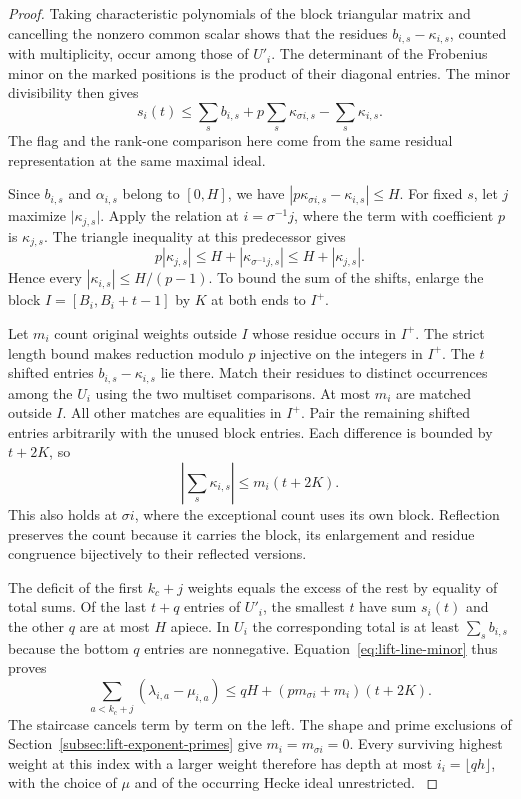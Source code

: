 \begin{proof}
Taking characteristic
polynomials of the block triangular matrix and cancelling
the nonzero common scalar shows that the residues
\(b_{i,s}-\kappa_{i,s}\), counted with multiplicity, occur
among those of \(U'_i\). The determinant of the Frobenius
minor on the marked positions is the product of their
diagonal entries. The minor divisibility then gives
\begin{equation}\label{eq:lift-line-minor}
       s_i(t)\le\sum_s b_{i,s}
              +p\sum_s\kappa_{\sigma i,s}-\sum_s\kappa_{i,s}.
\end{equation}
The flag and the rank-one comparison here come from the
same residual representation at the same maximal ideal.
\label{cor:lift-weight-exchange-1}

Since \(b_{i,s}\) and \(\alpha_{i,s}\) belong to \([0,H]\),
we have \(|p\kappa_{\sigma i,s}-\kappa_{i,s}|\le H\).
For fixed \(s\), let \(j\) maximize \(\lvert\kappa_{j,s}\rvert\).
Apply the relation at \(i=\sigma^{-1}j\), where the term
with coefficient \(p\) is \(\kappa_{j,s}\). The triangle inequality at this predecessor gives
\[
 p|\kappa_{j,s}|\le H+|\kappa_{\sigma^{-1}j,s}|
            \le H+|\kappa_{j,s}| .
\]
Hence every \(|\kappa_{i,s}|\le H/(p-1)\).
To bound the sum of the shifts, enlarge the block
\(I=[B_i,B_i+t-1]\) by \(K\) at both ends to \(I^+\).

Let \(m_i\) count original weights outside \(I\) whose
residue occurs in \(I^+\). The strict length bound makes
reduction modulo \(p\) injective on the integers in \(I^+\).
The \(t\) shifted entries \(b_{i,s}-\kappa_{i,s}\) lie
there. Match their residues to distinct occurrences among
the \(U_i\) using the two multiset comparisons. At most
\(m_i\) are matched outside \(I\). All other matches are
equalities in \(I^+\). Pair the remaining shifted entries
arbitrarily with the unused block entries. Each difference
is bounded by \(t+2K\), so
\[
                \left|\sum_s\kappa_{i,s}\right|
                            \le m_i(t+2K).
\]
This also holds at \(\sigma i\), where the exceptional count
uses its own block. Reflection preserves the count because it
carries the block, its enlargement and residue congruence
bijectively to their reflected versions.

The deficit of the first \(k_c+j\) weights equals the excess
of the rest by equality of total sums. Of the last \(t+q\)
entries of \(U'_i\), the smallest \(t\) have sum \(s_i(t)\)
and the other \(q\) are at most \(H\) apiece. In \(U_i\)
the corresponding total is at least \(\sum_s b_{i,s}\)
because the bottom \(q\) entries are nonnegative. Equation~\eqref{eq:lift-line-minor}
thus proves
\[
 \sum_{a<k_c+j}(\lambda_{i,a}-\mu_{i,a})
   \le qH+(p m_{\sigma i}+m_i)(t+2K).
\]
The staircase cancels term by term on the left. The shape
and prime exclusions of Section~\ref{subsec:lift-exponent-primes}
give \(m_i=m_{\sigma i}=0\). Every surviving highest
weight at this index with a larger weight therefore has depth at most
\(i_i=\lfloor qh\rfloor\), with the choice of
\(\mu\) and of the occurring Hecke ideal unrestricted.
\label{cor:lift-weight-exchange-2}
\end{proof}
